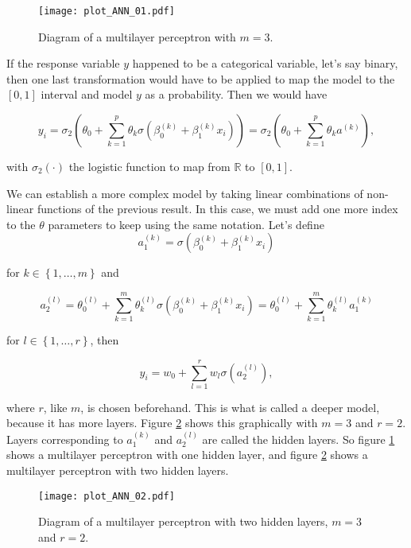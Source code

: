 \begin{figure}[H]
    \centering
    \texttt{[image: plot\_ANN\_01.pdf]}
    \caption{Diagram of a multilayer perceptron with $m = 3$.}
    \label{fig:theory_ANN_diagram_01}
\end{figure}

If the response variable $y$ happened to be a categorical variable, let's say binary, then one last transformation would have to be applied to map the model to the $\left[0, 1\right]$ interval and model $y$ as a probability. Then we would have

$$
y_i =
\sigma_2 \left( \theta_0 +  \sum_{k = 1}^p \theta_k \sigma \left( \beta_0^{(k)} + \beta_1^{(k)} x_i \right) \right) =
\sigma_2 \left( \theta_0 +  \sum_{k = 1}^p \theta_k a^{(k)} \right),
$$

with $\sigma_2(\cdot)$ the logistic function to map from $\mathbb{R}$ to $\left[ 0, 1 \right]$.

We can establish a more complex model by taking linear combinations of non-linear functions of the previous result. In this case, we must add one more index to the $\theta$ parameters to keep using the same notation. Let's define
$$
a_1^{(k)} = \sigma \left( \beta_0^{(k)} + \beta_1^{(k)} x_i \right)
$$

for $k \in \left\{ 1, \ldots, m \right\}$ and

$$
a_2^{(l)} = \theta_0^{(l)} +  \sum_{k = 1}^m \theta_k^{(l)} \sigma \left( \beta_0^{(k)} + \beta_1^{(k)} x_i \right) =
\theta_0^{(l)} +  \sum_{k = 1}^m \theta_k^{(l)} a_1^{(k)}
$$

for $l \in \left\{ 1, \ldots, r \right\}$, then

$$
y_i = w_0 + \sum_{l = 1}^r w_l \sigma \left( a_2^{(l)} \right),
$$

where $r$, like $m$, is chosen beforehand. This is what is called a deeper model, because it has more layers. Figure \ref{fig:theory_ANN_diagram_02} shows this graphically with $m = 3$ and $r = 2$. Layers corresponding to $a_1^{(k)}$ and $a_2^{(l)}$ are called the hidden layers. So figure \ref{fig:theory_ANN_diagram_01} shows a multilayer perceptron with one hidden layer, and figure \ref{fig:theory_ANN_diagram_02} shows a multilayer perceptron with two hidden layers.


\begin{figure}[H]
    \centering
    \texttt{[image: plot\_ANN\_02.pdf]}
    \caption{Diagram of a multilayer perceptron with two hidden layers, $m = 3$ and $r = 2$.}
    \label{fig:theory_ANN_diagram_02}
\end{figure}

